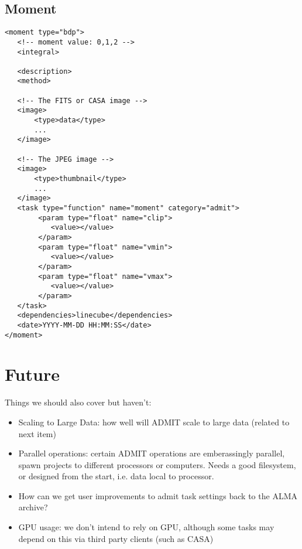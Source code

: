 \documentclass{article}
\begin{document}
\subsection{Moment}
\footnotesize
\begin{verbatim}
<moment type="bdp">
   <!-- moment value: 0,1,2 -->
   <integral>          

   <description>
   <method>

   <!-- The FITS or CASA image -->
   <image> 
       <type>data</type>
       ...
   </image>  

   <!-- The JPEG image -->
   <image> 
       <type>thumbnail</type>
       ...
   </image>  
   <task type="function" name="moment" category="admit">
        <param type="float" name="clip">
           <value></value>
        </param>
        <param type="float" name="vmin">
           <value></value>
        </param>
        <param type="float" name="vmax">
           <value></value>
        </param>
   </task>
   <dependencies>linecube</dependencies>
   <date>YYYY-MM-DD HH:MM:SS</date>
</moment>
\end{verbatim}


\section{Future}

Things we should also cover but haven't:

\begin{itemize}

\item
Scaling to Large Data:  how well will ADMIT scale to large data (related
to next item)

\item
Parallel operations:  certain ADMIT operations are emberassingly parallel, spawn
projects to different processors or computers.  Needs a good filesystem, or
designed from the start, i.e. data local to processor.

\item
How can we get user improvements to admit task settings back to the ALMA archive?

\item
GPU usage: we don't intend to rely on GPU, although some tasks may depend on this
via third party clients (such as CASA)

\end{itemize}
\end{document}
